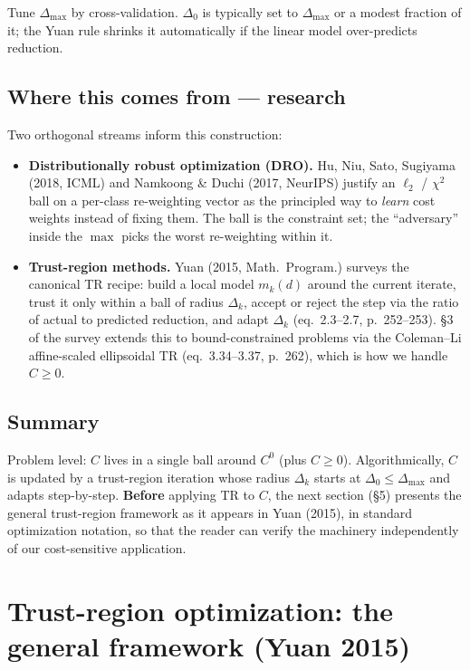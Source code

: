 \documentclass[11pt,a4paper]{article}
\begin{document}
Tune $\Delta_{\max}$ by cross-validation. $\Delta_0$ is typically set to $\Delta_{\max}$ or a modest fraction of it; the Yuan rule shrinks it automatically if the linear model over-predicts reduction.

\subsection{Where this comes from --- research}

Two orthogonal streams inform this construction:

\begin{itemize}[leftmargin=*,itemsep=2pt]
  \item \textbf{Distributionally robust optimization (DRO).} Hu, Niu, Sato, Sugiyama (2018, ICML) and Namkoong \& Duchi (2017, NeurIPS) justify an $\ell_2$ / $\chi^2$ ball on a per-class re-weighting vector as the principled way to \emph{learn} cost weights instead of fixing them. The ball is the constraint set; the ``adversary'' inside the $\max$ picks the worst re-weighting within it.
  \item \textbf{Trust-region methods.} Yuan (2015, Math.\ Program.) surveys the canonical TR recipe: build a local model $m_k(d)$ around the current iterate, trust it only within a ball of radius $\Delta_k$, accept or reject the step via the ratio of actual to predicted reduction, and adapt $\Delta_k$ (eq.\ 2.3--2.7, p.\ 252--253). \S 3 of the survey extends this to bound-constrained problems via the Coleman--Li affine-scaled ellipsoidal TR (eq.\ 3.34--3.37, p.\ 262), which is how we handle $C \ge 0$.
\end{itemize}

\subsection{Summary}

Problem level: $C$ lives in a single ball around $C^0$ (plus $C \ge 0$). Algorithmically, $C$ is updated by a trust-region iteration whose radius $\Delta_k$ starts at $\Delta_0 \le \Delta_{\max}$ and adapts step-by-step. \textbf{Before} applying TR to $C$, the next section (\S 5) presents the general trust-region framework as it appears in Yuan (2015), in standard optimization notation, so that the reader can verify the machinery independently of our cost-sensitive application.

\section{Trust-region optimization: the general framework (Yuan 2015)}
\label{sec:tr-general}
\end{document}
